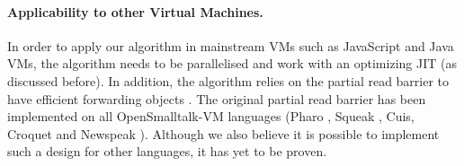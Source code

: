 \documentclass[sigplan,10pt,review,anonymous]{acmart}\settopmatter{printfolios=true,printccs=false,printacmref=false}
\newcommand{\eem}[1]{\color{olive}\fbox{\bfseries\sffamily\scriptsize Eliot:}{\sf\small$\blacktriangleright$\textit{#1}$\blacktriangleleft$}\color{black}}
\def\OpenSmalltalkVM{OpenSmalltalk-VM\xspace}
\begin{document}

\paragraph{Applicability to other Virtual Machines.}
In order to apply our algorithm in mainstream VMs such as JavaScript and Java VMs, the algorithm needs to be parallelised and work with an optimizing JIT (as discussed before).
In addition, the algorithm relies on the partial read barrier to have efficient forwarding objects \cite{Forwarders}. The original partial read barrier has been implemented on all \OpenSmalltalkVM languages (Pharo \cite{PharoByExample}, Squeak \cite{SqueakByExample}, Cuis, Croquet and Newspeak \cite{NewspeakOopsla}).
Although we also believe it is possible to implement such a design for other languages, it has yet to be proven.
\end{document}
